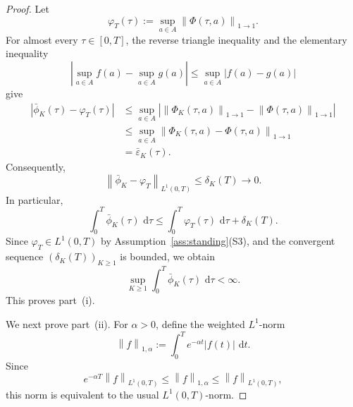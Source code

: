 \documentclass[11pt]{article}
\theoremstyle{remarkitalic}
\theoremstyle{remarkitalic}
\newcommand{\dd}{\,\mathrm d}
\newcommand{\1}{\mathbf 1}
\newcommand{\norm}[1]{\left\lVert #1 \right\rVert}
\begin{document}
\begin{proof}
Let
\[
    \varphi_T(\tau)
    :=
    \sup_{a\in A}
    \norm{\Phi(\tau,a)}_{1\to1}.
\]
For almost every $\tau\in[0,T]$, the reverse triangle inequality and
the elementary inequality
\[
    \left|
        \sup_{a\in A} f(a)-\sup_{a\in A}g(a)
    \right|
    \le
    \sup_{a\in A}|f(a)-g(a)|
\]
give
\begin{align*}
    \left|
        \bar\phi_K(\tau)-\varphi_T(\tau)
    \right|
    &\le
    \sup_{a\in A}
    \left|
        \norm{\Phi_K(\tau,a)}_{1\to1}
        -
        \norm{\Phi(\tau,a)}_{1\to1}
    \right|\\
    &\le
    \sup_{a\in A}
    \norm{
        \Phi_K(\tau,a)-\Phi(\tau,a)
    }_{1\to1}\\
    &=
    \bar\varepsilon_K(\tau).
\end{align*}
Consequently,
\begin{equation}\label{eq:phi-envelope-convergence}
    \norm{
        \bar\phi_K-\varphi_T
    }_{L^1(0,T)}
    \le
    \delta_K(T)
    \longrightarrow 0.
\end{equation}
In particular,
\[
    \int_0^T\bar\phi_K(\tau)\,\dd\tau
    \le
    \int_0^T\varphi_T(\tau)\,\dd\tau
    +
    \delta_K(T).
\]
Since $\varphi_T\in L^1(0,T)$ by
Assumption~\ref{ass:standing}(S3), and the convergent sequence
$(\delta_K(T))_{K\ge1}$ is bounded, we obtain
\[
    \sup_{K\ge1}
    \int_0^T\bar\phi_K(\tau)\,\dd\tau
    <\infty.
\]
This proves part~\textup{(i)}.

\noindent We next prove part~\textup{(ii)}. For $\alpha>0$, define the weighted
$L^1$-norm
\[
    \norm{f}_{1,\alpha}
    :=
    \int_0^T e^{-\alpha t}|f(t)|\,\dd t.
\]
Since
\[
    e^{-\alpha T}\norm{f}_{L^1(0,T)}
    \le
    \norm{f}_{1,\alpha}
    \le
    \norm{f}_{L^1(0,T)},
\]
this norm is equivalent to the usual $L^1(0,T)$-norm.


\end{proof}
\end{document}
